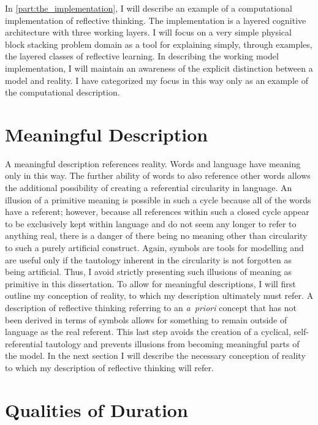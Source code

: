 In \autoref{part:the_implementation}, I will describe an example of a
computational implementation of reflective thinking.  The
implementation is a layered cognitive architecture with three working
layers.  I will focus on a very simple physical block stacking problem
domain as a tool for explaining simply, through examples, the layered
classes of reflective learning.  In describing the working model
implementation, I will maintain an awareness of the explicit
distinction between a model and reality.  I have categorized my focus
in this way only as an example of the computational description.

\section{Meaningful Description}

A meaningful description references reality.  Words and language have
meaning only in this way.  The further ability of words to also
reference other words allows the additional possibility of creating a
referential circularity in language.  An illusion of a primitive
meaning is possible in such a cycle because all of the words have a
referent; however, because all references within such a closed cycle
appear to be exclusively kept within language and do not seem any
longer to refer to anything real, there is a danger of there being no
meaning other than circularity to such a purely artificial construct.
Again, symbols are tools for modelling and are useful only if the
tautology inherent in the circularity is not forgotten as being
artificial.  Thus, I avoid strictly presenting such illusions of
meaning as primitive in this dissertation.  To allow for meaningful
descriptions, I will first outline my conception of reality, to which
my description ultimately must refer.  A description of reflective
thinking referring to an \emph{a~priori} concept that has not been
derived in terms of symbols allows for something to remain outside of
language as the real referent.  This last step avoids the creation of
a cyclical, self-referential tautology and prevents illusions from
becoming meaningful parts of the model.  In the next section I will
describe the necessary conception of reality to which my description
of reflective thinking will refer.

\section{Qualities of Duration}

